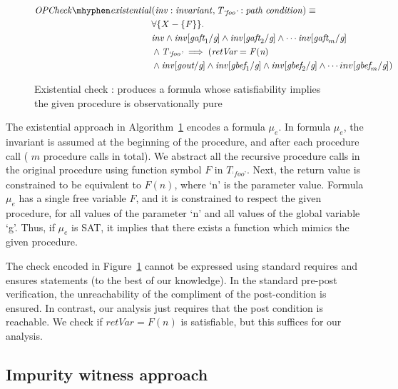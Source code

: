 \documentclass{llncs}
\newcommand{\foo}{\textit{`foo'}}
\newcommand{\inv}{\mathit{inv}}
\newcommand{\pathCondition}{\mathit{T_{\foo}}}
\newcommand{\OPCheckE}{\mathit{OPCheck \mhyphen existential}}
\newcommand{\mi}[1]{\mathit{#1}}
\newcommand{\retVar}{\textit{retVar}}
\newcommand{\F}{\mathit{F}}
\newcommand{\n}{\textit{n}}
\newcommand{\g}{\textit{g}}
\newcommand{\gout}{\textit{gout}}
\newcommand{\gbef}{\textit{gbef}}
\newcommand{\gaft}{\textit{gaft}}
\newcommand{\formula}{\mu}
\begin{document}
\begin{figure}[htp]
  \begin{algorithm}[H]
    \begin{align*}
      \OPCheckE
       & \mi{(\inv :
        invariant, \pathCondition : path \; condition)} \equiv \\
      &\forall \{X - \{\F\}\}.\\
      &\inv \wedge \inv[\gaft_1/\g] \wedge \inv[\gaft_2/\g] \wedge
      \cdots \inv[\gaft_m/\g] \\
      &\wedge \pathCondition \implies ( \retVar = \F(\n)\\
            & \wedge \inv[\gout/\g] \wedge  \inv[\gbef_1/\g] \wedge
      \inv[\gbef_2/\g] \wedge \cdots inv[\gbef_m/\g]) \\
    \end{align*}
    \caption{Existential check : produces a formula whose
      satisfiability implies the given procedure is observationally
      pure} 
    \label{algo:someOPcheckCombined}
  \end{algorithm}  
\end{figure}

The existential approach in Algorithm~\ref{algo:someOPcheckCombined}
encodes a formula $\formula_e$. In formula $\formula_e$, the invariant
is assumed at the beginning of the procedure, and after each procedure
call ( $m$ procedure calls in total).  We abstract all the recursive
procedure calls in the original procedure using function symbol $\F$
in $\pathCondition$.  Next, the return value is constrained to be
equivalent to $\F(n)$, where `n' is the parameter value. Formula
$\formula_e$ has a single free variable $\F$, and it is constrained to
respect the given procedure, for all values of the parameter `n' and
all values of the global variable `g'. Thus, if $\formula_e$ is SAT,
it implies that there exists a function which mimics the given
procedure. 

The check encoded in Figure~\ref{algo:someOPcheckCombined} cannot be
expressed using standard requires and ensures statements (to the best
of our knowledge). In the standard pre-post verification, the
unreachability of the compliment of the post-condition is ensured. In
contrast, our analysis just requires that the post condition is
reachable. We check if $\retVar = \F(n)$ is satisfiable, but this
suffices for our analysis.

\subsection{Impurity witness approach}\label{sec:impurityWitness}
\end{document}
